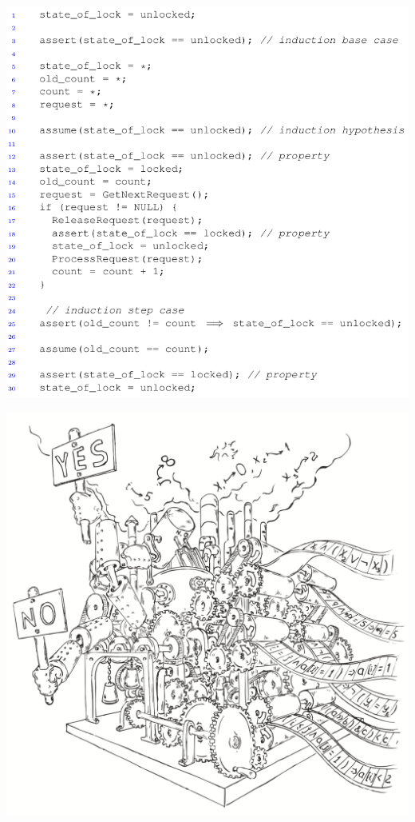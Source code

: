 \documentclass{beamer}
\begin{document}
\begin{frame}
\includegraphics[scale=0.35]{new_code2.png}
\end{frame}

\begin{frame}
\includegraphics[scale=0.5]{../decision-procedure.png}
\end{frame}
\end{document}
